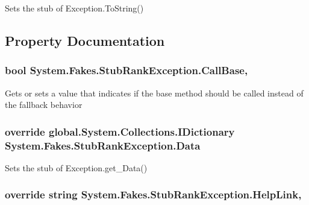 Sets the stub of Exception.\-To\-String()



\subsection{Property Documentation}
\hypertarget{class_system_1_1_fakes_1_1_stub_rank_exception_ae7b84da7f4fa3802efc9ccb3d4419cdd}{
\subsubsection[{Call\-Base}]{\setlength{\rightskip}{0pt plus 5cm}bool System.\-Fakes.\-Stub\-Rank\-Exception.\-Call\-Base\hspace{0.3cm}{\ttfamily [get]}, {\ttfamily [set]}}}\label{class_system_1_1_fakes_1_1_stub_rank_exception_ae7b84da7f4fa3802efc9ccb3d4419cdd}


Gets or sets a value that indicates if the base method should be called instead of the fallback behavior

\hypertarget{class_system_1_1_fakes_1_1_stub_rank_exception_afdb49fddf69561d3b42d73eb54f3745d}{
\subsubsection[{Data}]{\setlength{\rightskip}{0pt plus 5cm}override global.\-System.\-Collections.\-I\-Dictionary System.\-Fakes.\-Stub\-Rank\-Exception.\-Data\hspace{0.3cm}{\ttfamily [get]}}}\label{class_system_1_1_fakes_1_1_stub_rank_exception_afdb49fddf69561d3b42d73eb54f3745d}


Sets the stub of Exception.\-get\-\_\-\-Data()

\hypertarget{class_system_1_1_fakes_1_1_stub_rank_exception_a43beefb187025e122e8cc62baab6f798}{
\subsubsection[{Help\-Link}]{\setlength{\rightskip}{0pt plus 5cm}override string System.\-Fakes.\-Stub\-Rank\-Exception.\-Help\-Link\hspace{0.3cm}{\ttfamily [get]}, {\ttfamily [set]}}}\label{class_system_1_1_fakes_1_1_stub_rank_exception_a43beefb187025e122e8cc62baab6f798}


